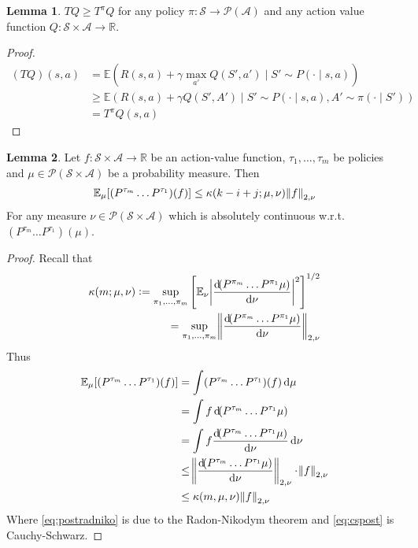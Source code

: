 \documentclass{article}
\theoremstyle{definition}
\newtheorem{lem}{Lemma}
\newcommand{\bb}{\mathbb}
\newcommand{\Cal}{\mathcal}
\newcommand{\E}{\bb{E}}
\newcommand{\R}{\bb{R}}
\begin{document}
\begin{lem}\label{lem:tlemma}
  $T Q \geq T^\pi Q$ for any policy $\pi : \Cal{S} \to \Cal{P}(\Cal{A})$
  and any action value function $Q: \Cal{S} \times \Cal{A} \to \R$.
\end{lem}
\begin{proof}
  \begin{align*}
    (TQ)(s, a) &= \E \left( R(s, a) + \gamma \max_{a'} Q(S', a')
    \mid S' \sim P(\cdot \mid s, a) \right)
    \\ &\geq \E \left( R(s, a) + \gamma Q(S', A')
    \mid S' \sim P(\cdot \mid s, a), A' \sim \pi(\cdot \mid S') \right)
    \\ &= T^\pi Q(s,a)
  \end{align*}
\end{proof}

\begin{lem}\label{lem:MRN}
  Let $f:\Cal{S}\times\Cal{A} \to \R$ be an action-value function,
  $\tau_1, \dots, \tau_m$ be policies
  and $\mu \in \Cal{P}(\Cal{S}\times\Cal{A})$ be a probability measure.
  Then
  \begin{align*}
    \E_\mu [(P^{\tau_m} \dots P^{\tau_1})(f)]
    \leq \kappa(k - i + j; \mu, \nu) \norm{f}_{2,\nu}
  \end{align*}
  For any measure $\nu \in \Cal{P}(\Cal{S}\times\Cal{A})$ which is
  absolutely continuous w.r.t. $(P^{\tau_m} \dots P^{\tau_1})(\mu)$.
\end{lem}
\begin{proof}
  Recall that
  \begin{align*}
    \kappa(m; \mu, \nu) := \sup_{\pi_1, \dots, \pi_m} \left[
      \E_{\nu} \abs{\frac{\dif (P^{\pi_m}\dots P^{\pi_1}\mu)}{\dif \nu}}^2
      \right]^{1/2}
      \\ = \sup_{\pi_1, \dots, \pi_m}
      \norm{\frac{\dif (P^{\pi_m}\dots P^{\pi_1}\mu)}{\dif \nu}}_{2, \nu}
  \end{align*}
  Thus
  \begin{align}
    \E_\mu [(P^{\tau_m} \dots P^{\tau_1})(f)]
    &= \int (P^{\tau_m} \dots P^{\tau_1})(f) \dif \mu
    \\ &= \int f \dif (P^{\tau_m} \dots P^{\tau_1} \mu)
    \label{eq:preradniko}
    \\ &= \int f \frac{\dif(P^{\tau_m} \dots P^{\tau_1} \mu)}{\dif \nu} \dif \nu
    \label{eq:postradniko}
    \\ &\leq \norm{\frac{\dif(P^{\tau_m} \dots P^{\tau_1} \mu)}{\dif \nu}}_{2,\nu}
    \cdot \norm{f}_{2, \nu} \label{eq:cspost}
    \\ &\leq \kappa(m, \mu, \nu) \norm{f}_{2,\nu}
  \end{align}
  Where \cref{eq:postradniko} is due to the Radon-Nikodym theorem
  and \cref{eq:cspost} is Cauchy-Schwarz.
\end{proof}
\end{document}
